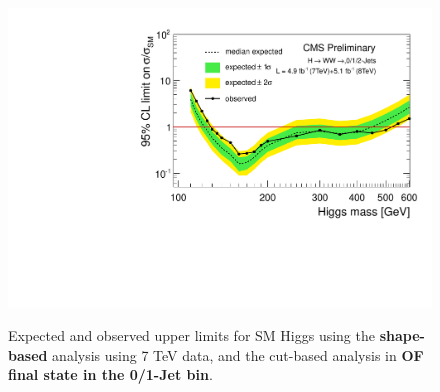 
\begin{figure}[!hbtp]
\centering
\label{subfig:sm_ichep2012_comb}
\includegraphics[width=.45\textwidth]{figures/limits_nj_shape7TeV_cut8TeV-CLs-asymptotic_log.pdf}
\label{fig:uls_cut_finalcomb}
\caption{Expected and observed upper limits for SM Higgs using the
  {\bf shape-based} analysis using 7 TeV data, and the cut-based analysis in 
{\bf OF final state in the 0/1-Jet bin}. }
\end{figure}

